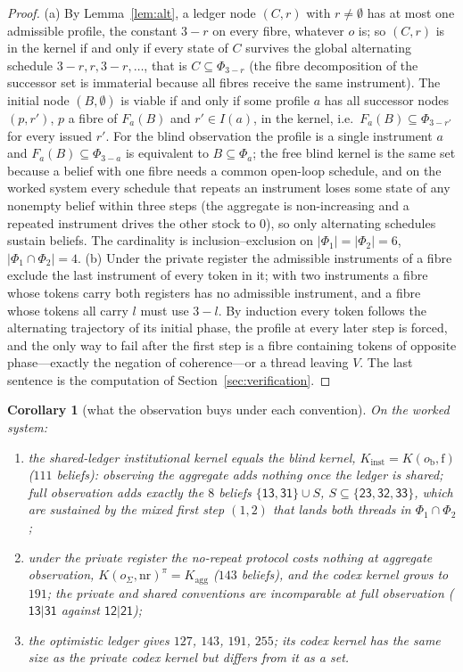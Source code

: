 \documentclass[11pt,a4paper]{article}
\theoremstyle{plain}
\newtheorem{corollary}[theorem]{Corollary}
\theoremstyle{definition}
\theoremstyle{remark}
\newcommand{\st}[1]{\mathsf{#1}}
\newcommand{\priv}{\pi}
\newcommand{\free}{\mathrm{f}}
\newcommand{\nr}{\mathrm{nr}}
\newcommand{\oagg}{o_{\Sigma}}
\newcommand{\oblind}{o_{\mathrm{b}}}
\newcommand{\Kinst}{K_{\mathrm{inst}}}
\newcommand{\Kagg}{K_{\mathrm{agg}}}
\begin{document}
\begin{proof}
(a) By Lemma~\ref{lem:alt}, a ledger node $(C,r)$ with $r\neq\emptyset$ has at most one admissible profile, the constant $3-r$ on every fibre, whatever $o$ is; so $(C,r)$ is in the kernel if and only if every state of $C$ survives the global alternating schedule $3-r,r,3-r,\dots$, that is $C\subseteq\Phi_{3-r}$ (the fibre decomposition of the successor set is immaterial because all fibres receive the same instrument). The initial node $(B,\emptyset)$ is viable if and only if some profile $a$ has all successor nodes $(p,r')$, $p$ a fibre of $F_a(B)$ and $r'\in I(a)$, in the kernel, i.e.\ $F_a(B)\subseteq\Phi_{3-r'}$ for every issued $r'$. For the blind observation the profile is a single instrument $a$ and $F_a(B)\subseteq\Phi_{3-a}$ is equivalent to $B\subseteq\Phi_a$; the free blind kernel is the same set because a belief with one fibre needs a common open-loop schedule, and on the worked system every schedule that repeats an instrument loses some state of any nonempty belief within three steps (the aggregate is non-increasing and a repeated instrument drives the other stock to $0$), so only alternating schedules sustain beliefs. The cardinality is inclusion--exclusion on $|\Phi_1|=|\Phi_2|=6$, $|\Phi_1\cap\Phi_2|=4$.
(b) Under the private register the admissible instruments of a fibre exclude the last instrument of every token in it; with two instruments a fibre whose tokens carry both registers has no admissible instrument, and a fibre whose tokens all carry $l$ must use $3-l$. By induction every token follows the alternating trajectory of its initial phase, the profile at every later step is forced, and the only way to fail after the first step is a fibre containing tokens of opposite phase---exactly the negation of coherence---or a thread leaving $V$.
The last sentence is the computation of Section~\ref{sec:verification}.
\end{proof}

\begin{corollary}[what the observation buys under each convention]\label{cor:conv}
On the worked system:
\begin{enumerate}[label=(\alph*),leftmargin=2em,itemsep=1pt]
\item the shared-ledger institutional kernel equals the blind kernel, $\Kinst=K(\oblind,\free)$ ($111$ beliefs): observing the aggregate adds nothing once the ledger is shared; full observation adds exactly the $8$ beliefs $\{\st{13},\st{31}\}\cup S$, $S\subseteq\{\st{23},\st{32},\st{33}\}$, which are sustained by the mixed first step $(1,2)$ that lands both threads in $\Phi_1\cap\Phi_2$;
\item under the private register the no-repeat protocol costs nothing at aggregate observation, $K(\oagg,\nr)^{\priv}=\Kagg$ ($143$ beliefs), and the codex kernel grows to $191$; the private and shared conventions are incomparable at full observation ($\st{13|31}$ against $\st{12|21}$);
\item the optimistic ledger gives $127$, $143$, $191$, $255$; its codex kernel has the same size as the private codex kernel but differs from it as a set.
\end{enumerate}
\end{corollary}
\end{document}
